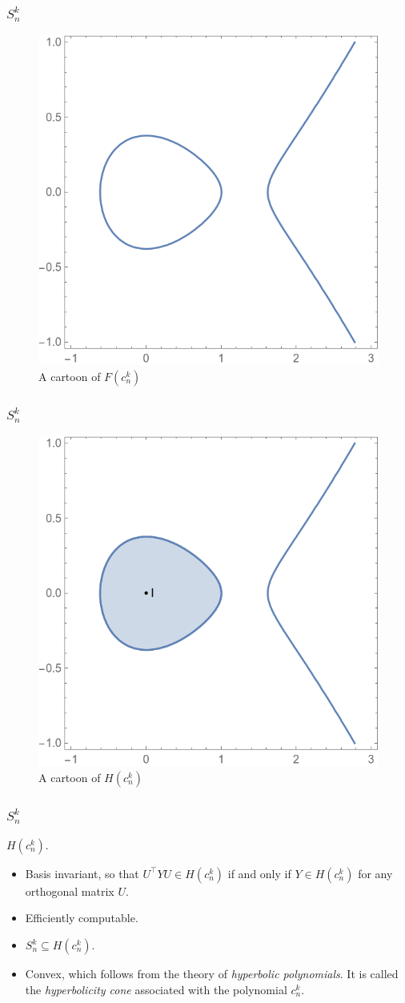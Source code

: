 \documentclass{beamer}
\begin{document}
\begin{frame}
    \frametitle{$S^k_n$}
    \begin{figure}[h]
        \centering
        \includegraphics[width=0.6\linewidth]{variety.png}
        \caption{A cartoon of $F(c^k_n)$}%
        \label{fig:variety}
    \end{figure}
\end{frame}
\begin{frame}
    \frametitle{$S^k_n$}
    \begin{figure}[h]
        \centering
        \includegraphics[width=0.6\linewidth]{hcone.png}
        \caption{A cartoon of $H(c^k_n)$}%
        \label{fig:variety}
    \end{figure}
\end{frame}
\begin{frame}
    \frametitle{$S^k_n$}
    $H(c^k_n)$.
    \begin{itemize}
        \item Basis invariant, so that $U^{\intercal} Y U \in H(c^k_n)$ if and only if $Y \in H(c^k_n)$ for any orthogonal matrix $U$.
        \pause
        \item Efficiently computable.
        \pause
        \item $S^k_n \subseteq H(c^k_n).$
        \pause
        \item Convex, which follows from the theory of \emph{hyperbolic polynomials}. It is called the \emph{hyperbolicity cone} associated with the polynomial $c_n^k$.
    \end{itemize}
\end{frame}
\end{document}
